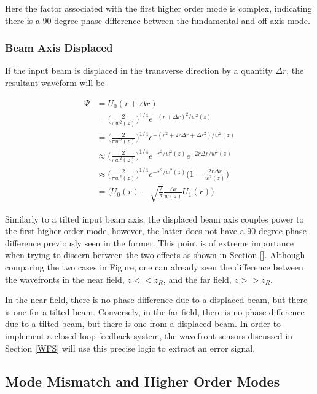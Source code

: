 		Here the factor associated with the first higher order mode is complex, indicating there is a 90 degree phase difference between the fundamental and off axis mode. 
		\subsubsection{Beam Axis Displaced}
		If the input beam is displaced in the transverse direction by a quantity $\Delta r$, the resultant waveform will be
		
		\begin{equation}
		\begin{aligned}
			\Psi 	&=  		U_{0}(r + \Delta r	) 
			\\		&= 			\bigg( \frac{2}{\pi w^2(z)} \bigg)^{1/4}  e^{-(r+\Delta r)^2/w^2(z)}
			\\		&= 			\bigg( \frac{2}{\pi w^2(z)} \bigg)^{1/4}  e^{-(r^2 + 2r \Delta r  + \Delta r^2)/w^2(z)}
			\\		&\approx 	\bigg( \frac{2}{\pi w^2(z)} \bigg)^{1/4}  e^{-r^2/w^2(z)} e^{-2r \Delta r/w^2(z)}
			\\		&\approx 	\bigg( \frac{2}{\pi w^2(z)} \bigg)^{1/4}  e^{-r^2/w^2(z)} \bigg(1 - \frac{2r \Delta r}{w^2(z)} \bigg)
			\\		&=			\bigg( U_0(r) - \sqrt{\frac{2}{\pi}} \frac{\Delta r }{w(z)} U_1(r)	 \bigg)
		\end{aligned}
		\end{equation} 
		
		Similarly to a tilted input beam axis, the displaced beam axis couples power to the first higher order mode, however, the latter does not have a 90 degree phase difference previously seen in the former.  This point is of extreme importance when trying to discern between the two effects as shown in Section [].  Although comparing the two cases in Figure, one can already seen the difference between the wavefronts in the near field, $z<<z_R$, and the far field, $z>>z_R$.  
		
		In the near field, there is no phase difference due to a displaced beam, but there is one for a tilted beam.  Conversely, in the far field, there is no phase difference due to a tilted beam, but there is one from a displaced beam.  In order to implement a closed loop feedback system, the wavefront sensors discussed in Section \ref{WFS} will use this precise logic to extract an error signal.
		
		
		\subsection{Mode Mismatch and Higher Order Modes}\label{Modemismatch}
		
